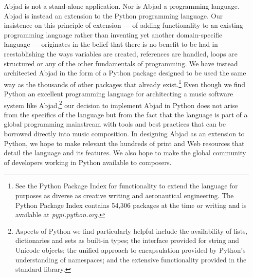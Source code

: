 \documentclass{article}
\begin{document}
Abjad is not a stand-alone application. Nor is Abjad a programming language.
Abjad is instead an extension to the Python programming language. Our
insistence on this principle of extension --- of adding functionality to an
existing programming language rather than inventing yet another domain-specific
language --- originates in the belief that there is no benefit to be had in
reestablishing the ways variables are created, references are handled, loops
are structured or any of the other fundamentals of programming. We have instead
architected Abjad in the form of a Python package designed to be used the same
way as the thousands of other packages that already exist.\footnote{See the
Python Package Index for functionality to extend the language for purposes as
diverse as creative writing and aeronautical engineering. The Python Package
Index contains 54,306 packages at the time or writing and is available at
\textit{pypi.python.org}.} Even though we find Python an excellent programming
language for architecting a music software system like Abjad,\footnote{Aspects
of Python we find particularly helpful include the availability of lists,
dictionaries and sets as built-in types; the interface provided for string and
Unicode objects; the unified approach to encapsulation provided by Python's
understanding of namespaces; and the extensive functionality provided in the
standard library.} our decision to implement Abjad in Python does not arise
from the specifics of the language but from the fact that the language is part
of a global programming mainstream with tools and best practices that can be
borrowed directly into music composition. In designing Abjad as an extension to
Python, we hope to make relevant the hundreds of print and Web resources that
detail the language and its features. We also hope to make the global community
of developers working in Python available to composers.

\end{document}
